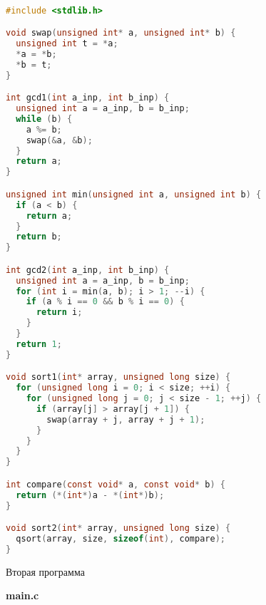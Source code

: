 \begin{lstlisting}[language=C]

#include <stdlib.h>

void swap(unsigned int* a, unsigned int* b) {
  unsigned int t = *a;
  *a = *b;
  *b = t;
}

int gcd1(int a_inp, int b_inp) {
  unsigned int a = a_inp, b = b_inp;
  while (b) {
    a %= b;
    swap(&a, &b);
  }
  return a;
}

unsigned int min(unsigned int a, unsigned int b) {
  if (a < b) {
    return a;
  }
  return b;
}

int gcd2(int a_inp, int b_inp) {
  unsigned int a = a_inp, b = b_inp;
  for (int i = min(a, b); i > 1; --i) {
    if (a % i == 0 && b % i == 0) {
      return i;
    }
  }
  return 1;
}

void sort1(int* array, unsigned long size) {
  for (unsigned long i = 0; i < size; ++i) {
    for (unsigned long j = 0; j < size - 1; ++j) {
      if (array[j] > array[j + 1]) {
        swap(array + j, array + j + 1);
      }
    }
  }
}

int compare(const void* a, const void* b) {
  return (*(int*)a - *(int*)b);
}

void sort2(int* array, unsigned long size) {
  qsort(array, size, sizeof(int), compare);
}

\end{lstlisting}

\pagebreak

{\large Вторая программа}

\textbf{main.c}

